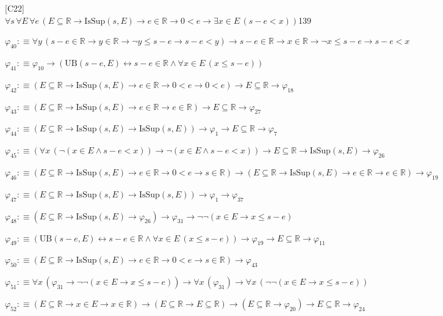 \begin{fullproof}{[C22]}{$\forall s\,\forall E\,\forall e\,(E \subseteq \mathbb{R} \to \mathrm{IsSup}(s,E) \to e \in \mathbb{R} \to 0 < e \to \exists x \in E\,(s - e < x))$}{139}
\begin{abbrevlist}
\item $\varphi_{40} :\equiv \forall y\,(s - e \in \mathbb{R} \to y \in \mathbb{R} \to \neg y \leq s - e \to s - e < y) \to s - e \in \mathbb{R} \to x \in \mathbb{R} \to \neg x \leq s - e \to s - e < x$
\item $\varphi_{41} :\equiv \varphi_{10} \to (\mathrm{UB}(s - e,E) \leftrightarrow s - e \in \mathbb{R} \land \forall x \in E\,(x \leq s - e))$
\item $\varphi_{42} :\equiv (E \subseteq \mathbb{R} \to \mathrm{IsSup}(s,E) \to e \in \mathbb{R} \to 0 < e \to 0 < e) \to E \subseteq \mathbb{R} \to \varphi_{18}$
\item $\varphi_{43} :\equiv (E \subseteq \mathbb{R} \to \mathrm{IsSup}(s,E) \to e \in \mathbb{R} \to e \in \mathbb{R}) \to E \subseteq \mathbb{R} \to \varphi_{27}$
\item $\varphi_{44} :\equiv (E \subseteq \mathbb{R} \to \mathrm{IsSup}(s,E) \to \mathrm{IsSup}(s,E)) \to \varphi_{1} \to E \subseteq \mathbb{R} \to \varphi_{7}$
\item $\varphi_{45} :\equiv (\forall x\,(\neg (x \in E \land s - e < x)) \to \neg (x \in E \land s - e < x)) \to E \subseteq \mathbb{R} \to \mathrm{IsSup}(s,E) \to \varphi_{26}$
\item $\varphi_{46} :\equiv (E \subseteq \mathbb{R} \to \mathrm{IsSup}(s,E) \to e \in \mathbb{R} \to 0 < e \to s \in \mathbb{R}) \to (E \subseteq \mathbb{R} \to \mathrm{IsSup}(s,E) \to e \in \mathbb{R} \to e \in \mathbb{R}) \to \varphi_{19}$
\item $\varphi_{47} :\equiv (E \subseteq \mathbb{R} \to \mathrm{IsSup}(s,E) \to \mathrm{IsSup}(s,E)) \to \varphi_{1} \to \varphi_{37}$
\item $\varphi_{48} :\equiv (E \subseteq \mathbb{R} \to \mathrm{IsSup}(s,E) \to \varphi_{26}) \to \varphi_{31} \to \neg \neg (x \in E \to x \leq s - e)$
\item $\varphi_{49} :\equiv (\mathrm{UB}(s - e,E) \leftrightarrow s - e \in \mathbb{R} \land \forall x \in E\,(x \leq s - e)) \to \varphi_{19} \to E \subseteq \mathbb{R} \to \varphi_{11}$
\item $\varphi_{50} :\equiv (E \subseteq \mathbb{R} \to \mathrm{IsSup}(s,E) \to e \in \mathbb{R} \to 0 < e \to s \in \mathbb{R}) \to \varphi_{43}$
\item $\varphi_{51} :\equiv \forall x\,(\varphi_{31} \to \neg \neg (x \in E \to x \leq s - e)) \to \forall x\,(\varphi_{31}) \to \forall x\,(\neg \neg (x \in E \to x \leq s - e))$
\item $\varphi_{52} :\equiv (E \subseteq \mathbb{R} \to x \in E \to x \in \mathbb{R}) \to (E \subseteq \mathbb{R} \to E \subseteq \mathbb{R}) \to (E \subseteq \mathbb{R} \to \varphi_{20}) \to E \subseteq \mathbb{R} \to \varphi_{24}$

\end{abbrevlist}
\end{fullproof}
